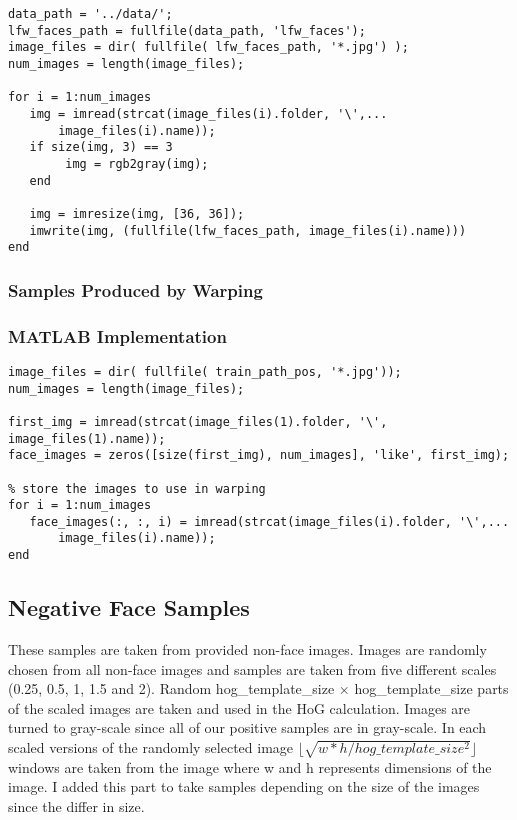 \documentclass{article}
\begin{document}
\begin{lstlisting}[caption={MATLAB script for processing images taken from LFW database.},captionpos=b]
data_path = '../data/'; 
lfw_faces_path = fullfile(data_path, 'lfw_faces');
image_files = dir( fullfile( lfw_faces_path, '*.jpg') );
num_images = length(image_files);

for i = 1:num_images
   img = imread(strcat(image_files(i).folder, '\',...
       image_files(i).name));
   if size(img, 3) == 3
        img = rgb2gray(img);
   end
    
   img = imresize(img, [36, 36]);
   imwrite(img, (fullfile(lfw_faces_path, image_files(i).name)))
end
\end{lstlisting}

\subsubsection{Samples Produced by Warping}

\subsubsection{MATLAB Implementation}
\begin{lstlisting}[caption={MATLAB script for processing images taken from LFW database.},captionpos=b]
image_files = dir( fullfile( train_path_pos, '*.jpg'));
num_images = length(image_files);

first_img = imread(strcat(image_files(1).folder, '\', image_files(1).name));
face_images = zeros([size(first_img), num_images], 'like', first_img); 

% store the images to use in warping
for i = 1:num_images
   face_images(:, :, i) = imread(strcat(image_files(i).folder, '\',...
       image_files(i).name)); 
end
\end{lstlisting}

\subsection{Negative Face Samples}
These samples are taken from provided non-face images. Images are randomly chosen from all non-face images and samples are taken from five different scales (0.25, 0.5, 1, 1.5 and 2). Random hog\_template\_size $\times$ hog\_template\_size parts of the scaled images are taken and used in the HoG calculation. Images are turned to gray-scale since all of our positive samples are in gray-scale. In each scaled versions of the randomly selected image $\lfloor \sqrt{w * h / hog\_template\_size^2}\rfloor$ windows are taken from the image where w and h represents dimensions of the image. I added this part to take samples depending on the size of the images since the differ in size.
\end{document}

